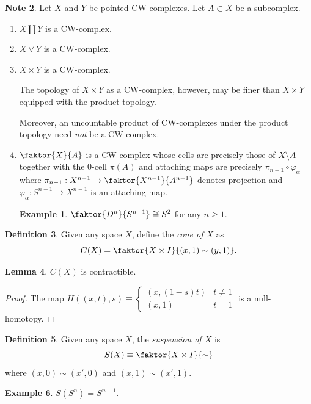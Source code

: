 \documentclass[10pt,letterpaper,cm]{nupset}
\theoremstyle{definition}
\newtheorem{definition}{Definition}[subsection]
\newtheorem{exmp}[definition]{Example}
\newtheorem{note}[definition]{Note}
\theoremstyle{theorem}
\newtheorem{lemma}[definition]{Lemma}
\theoremstyle{remark}
\newcommand{\1}{\mathbb{1}}
\newcommand{\0}{\vec 0}
\begin{document}
\begin{note} Let $X$ and $Y$ be pointed CW-complexes. Let $A\subset X$ be a subcomplex.
\begin{enumerate}
\item $X\coprod Y$ is a CW-complex.
\item $X \vee Y$ is a CW-complex.
\item $X\times Y$ is a CW-complex.

 The topology of $X \times Y$ as a CW-complex, however, may be finer than $X\times Y$ equipped with the product topology. 

Moreover, an uncountable product of CW-complexes under the product topology need \emph{not} be a CW-complex.


\item $\faktor{X}{A}$ is a CW-complex whose cells are precisely those of $X\setminus A$ together with the $0$-cell $\pi(A)$ and attaching maps are precisely $\pi_{n-1} \circ \varphi_{\alpha}$ where $\pi_{n-1} : X^{n-1} \to \faktor{X^{n-1}}{A^{n-1}}$ denotes projection and $\varphi_{\alpha} :S^{n-1} \to X^{n-1}$ is an attaching map. 
\begin{exmp}
$\faktor{D^n}{S^{n-1}} \cong S^2$ for any $n\geq 1$.
\end{exmp}
\end{enumerate}
\end{note}

\begin{definition}
Given any space $X$, define the \textit{cone of $X$} as $$C(X) = \faktor{X\times I}{(x,1) \sim (y,1)}.   $$
\end{definition}
\begin{lemma}
$C(X)$ is contractible.
\end{lemma}
\begin{proof}
The map $H((x,t), s) \equiv \begin{cases} \left(x, (1-s)t\right) & t\ne 1 \\ (x,1) & t=1
\end{cases}$ is a null-homotopy.
\end{proof}

\begin{definition}
Given any space $X$, the \textit{suspension of $X$} is $$S(X) \equiv\faktor{X\times I}{\sim}$$ where $(x,0) \sim (x', 0)$ and $(x,1) \sim (x', 1)$. 
\end{definition}
\begin{exmp}
$S(S^n) = S^{n+1}.$
\end{exmp}
\end{document}
